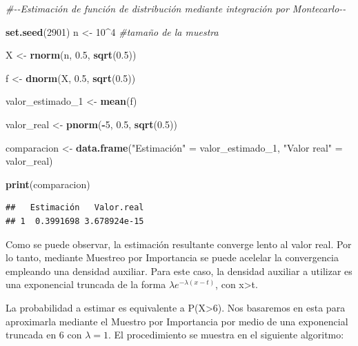 \documentclass[
]{article}
\newenvironment{Shaded}{\begin{snugshade}}{\end{snugshade}}
\newcommand{\CommentTok}[1]{\textcolor[rgb]{0.56,0.35,0.01}{\textit{#1}}}
\newcommand{\DecValTok}[1]{\textcolor[rgb]{0.00,0.00,0.81}{#1}}
\newcommand{\FloatTok}[1]{\textcolor[rgb]{0.00,0.00,0.81}{#1}}
\newcommand{\FunctionTok}[1]{\textcolor[rgb]{0.13,0.29,0.53}{\textbf{#1}}}
\newcommand{\NormalTok}[1]{#1}
\newcommand{\OtherTok}[1]{\textcolor[rgb]{0.56,0.35,0.01}{#1}}
\newcommand{\SpecialCharTok}[1]{\textcolor[rgb]{0.81,0.36,0.00}{\textbf{#1}}}
\newcommand{\StringTok}[1]{\textcolor[rgb]{0.31,0.60,0.02}{#1}}
\begin{document}
\begin{Shaded}
\begin{Highlighting}[]
\CommentTok{\#{-}{-}Estimación de función de distribución mediante integración por Montecarlo{-}{-}}

\FunctionTok{set.seed}\NormalTok{(}\DecValTok{2901}\NormalTok{)}
\NormalTok{n }\OtherTok{\textless{}{-}} \DecValTok{10}\SpecialCharTok{\^{}}\DecValTok{4} \CommentTok{\#tamaño de la muestra}

\NormalTok{X }\OtherTok{\textless{}{-}} \FunctionTok{rnorm}\NormalTok{(n, }\FloatTok{0.5}\NormalTok{, }\FunctionTok{sqrt}\NormalTok{(}\FloatTok{0.5}\NormalTok{))}

\NormalTok{f }\OtherTok{\textless{}{-}} \FunctionTok{dnorm}\NormalTok{(X, }\FloatTok{0.5}\NormalTok{, }\FunctionTok{sqrt}\NormalTok{(}\FloatTok{0.5}\NormalTok{))}

\NormalTok{valor\_estimado\_1 }\OtherTok{\textless{}{-}} \FunctionTok{mean}\NormalTok{(f)}

\NormalTok{valor\_real }\OtherTok{\textless{}{-}} \FunctionTok{pnorm}\NormalTok{(}\SpecialCharTok{{-}}\DecValTok{5}\NormalTok{, }\FloatTok{0.5}\NormalTok{, }\FunctionTok{sqrt}\NormalTok{(}\FloatTok{0.5}\NormalTok{))}

\NormalTok{comparacion }\OtherTok{\textless{}{-}} \FunctionTok{data.frame}\NormalTok{(}\StringTok{"Estimación"} \OtherTok{=}\NormalTok{ valor\_estimado\_1, }\StringTok{"Valor real"} \OtherTok{=}\NormalTok{ valor\_real)}

\FunctionTok{print}\NormalTok{(comparacion)}
\end{Highlighting}
\end{Shaded}

\begin{verbatim}
##   Estimación   Valor.real
## 1  0.3991698 3.678924e-15
\end{verbatim}

Como se puede observar, la estimación resultante converge lento al valor
real. Por lo tanto, mediante Muestreo por Importancia se puede acelelar
la convergencia empleando una densidad auxiliar. Para este caso, la
densidad auxiliar a utilizar es una exponencial truncada de la forma
\(\lambda e^{-\lambda(x-t)}\), con x\textgreater t.

La probabilidad a estimar es equivalente a P(X\textgreater6). Nos
basaremos en esta para aproximarla mediante el Muestro por Importancia
por medio de una exponencial truncada en 6 con \(\lambda = 1\). El
procedimiento se muestra en el siguiente algoritmo:
\end{document}
